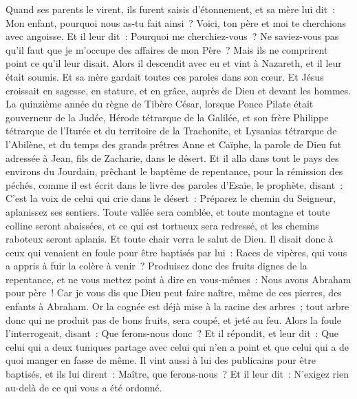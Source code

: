 \begin{multicols}{2}
Quand ses parents le virent, ils furent saisis d'étonnement, et sa mère lui dit~: Mon enfant, pourquoi nous as-tu fait ainsi~? Voici, ton père et moi te cherchions avec angoisse.
Et il leur dit~: Pourquoi me cherchiez-vous~? Ne saviez-vous pas qu'il faut que je m'occupe des affaires de mon Père~?
Mais ils ne comprirent point ce qu'il leur disait.
Alors il descendit avec eu et vint à Nazareth, et il leur était soumis. Et sa mère gardait toutes ces paroles dans son cœur.
Et Jésus croissait en sagesse, en stature, et en grâce, auprès de Dieu et devant les hommes.
\VerseOne{}La quinzième année du règne de Tibère César, lorsque Ponce Pilate était gouverneur de la Judée, Hérode tétrarque de la Galilée, et son frère Philippe tétrarque de l'Iturée et du territoire de la Trachonite, et Lysanias tétrarque de l'Abilène,
et du temps des grands prêtres Anne et Caïphe, la parole de Dieu fut adressée à Jean, fils de Zacharie, dans le désert.
Et il alla dans tout le pays des environs du Jourdain, prêchant le baptême de repentance, pour la rémission des péchés,
comme il est écrit dans le livre des paroles d'Esaïe, le prophète, disant~: C'est la voix de celui qui crie dans le désert~: Préparez le chemin du Seigneur, aplanissez ses sentiers.
Toute vallée sera comblée, et toute montagne et toute colline seront abaissées, et ce qui est tortueux sera redressé, et les chemins raboteux seront aplanis.
Et toute chair verra le salut de Dieu.
Il disait donc à ceux qui venaient en foule pour être baptisés par lui~: Races de vipères, qui vous a appris à fuir la colère à venir~?
Produisez donc des fruits dignes de la repentance, et ne vous mettez point à dire en vous-mêmes~: Nous avons Abraham pour père~! Car je vous dis que Dieu peut faire naître, même de ces pierres, des enfants à Abraham.
Or la cognée est déjà mise à la racine des arbres~; tout arbre donc qui ne produit pas de bons fruits, sera coupé, et jeté au feu.
Alors la foule l'interrogeait, disant~: Que ferons-nous donc~?
Et il répondit, et leur dit~: Que celui qui a deux tuniques partage avec celui qui n'en a point et que celui qui a de quoi manger en fasse de même.
Il vint aussi à lui des publicains pour être baptisés, et ils lui dirent~: Maître, que ferons-nous~?
Et il leur dit~: N'exigez rien au-delà de ce qui vous a été ordonné.

\end{multicols}
